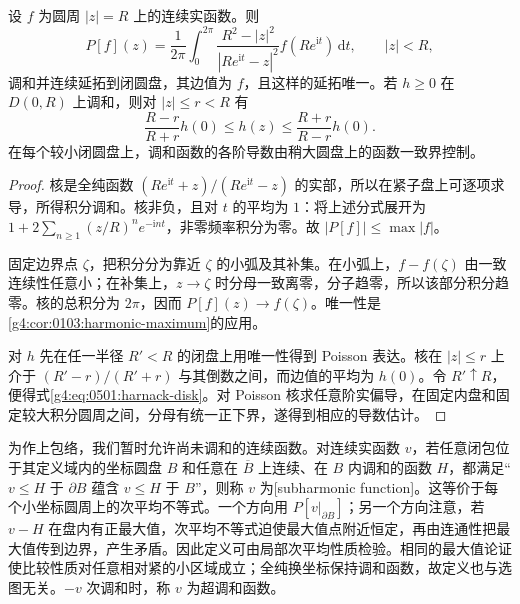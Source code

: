 \begin{lemma}
	\label{g4:lem:0501:poisson}
	设 \(f\) 为圆周 \(|z|=R\) 上的连续实函数。则
	\begin{equation}
		\label{g4:eq:0501:poisson}
		P[f](z)=\frac1{2\pi}\int_0^{2\pi}
		\frac{R^2-|z|^2}{|Re^{\mathrm{i}t}-z|^2}
		f(Re^{\mathrm{i}t})\,\mathrm{d}t,
		\qquad |z|<R,
	\end{equation}
	调和并连续延拓到闭圆盘，其边值为 \(f\)，且这样的延拓唯一。若 \(h\ge0\) 在 \(D(0,R)\) 上调和，则对 \(|z|\le r<R\) 有
	\begin{equation}
		\label{g4:eq:0501:harnack-disk}
		\frac{R-r}{R+r}h(0)\le h(z)
		\le\frac{R+r}{R-r}h(0).
	\end{equation}
	在每个较小闭圆盘上，调和函数的各阶导数由稍大圆盘上的函数一致界控制。
\end{lemma}
\begin{proof}
	核是全纯函数 \((Re^{\mathrm{i}t}+z)/(Re^{\mathrm{i}t}-z)\) 的实部，所以在紧子盘上可逐项求导，所得积分调和。核非负，且对 \(t\) 的平均为 \(1\)：将上述分式展开为 \(1+2\sum_{n\ge1}(z/R)^ne^{-\mathrm{i}nt}\)，非零频率积分为零。故 \(|P[f]|\le\max|f|\)。

	固定边界点 \(\zeta\)，把积分分为靠近 \(\zeta\) 的小弧及其补集。在小弧上，\(f-f(\zeta)\) 由一致连续性任意小；在补集上，\(z\to\zeta\) 时分母一致离零，分子趋零，所以该部分积分趋零。核的总积分为 \(2\pi\)，因而 \(P[f](z)\to f(\zeta)\)。唯一性是\cref{g4:cor:0103:harmonic-maximum}的应用。

	对 \(h\) 先在任一半径 \(R'<R\) 的闭盘上用唯一性得到 Poisson 表达。核在 \(|z|\le r\) 上介于 \((R'-r)/(R'+r)\) 与其倒数之间，而边值的平均为 \(h(0)\)。令 \(R'\uparrow R\)，便得式\eqref{g4:eq:0501:harnack-disk}。对 Poisson 核求任意阶实偏导，在固定内盘和固定较大积分圆周之间，分母有统一正下界，遂得到相应的导数估计。
\end{proof}

为作上包络，我们暂时允许尚未调和的连续函数。对连续实函数 \(v\)，若任意闭包位于其定义域内的坐标圆盘 \(B\) 和任意在 \(\overline B\) 上连续、在 \(B\) 内调和的函数 \(H\)，都满足“\(v\le H\) 于 \(\partial B\) 蕴含 \(v\le H\) 于 \(B\)”，则称 \(v\) 为[subharmonic function]。这等价于每个小坐标圆周上的次平均不等式。一个方向用 \(P[v|_{\partial B}]\)；另一个方向注意，若 \(v-H\) 在盘内有正最大值，次平均不等式迫使最大值点附近恒定，再由连通性把最大值传到边界，产生矛盾。因此定义可由局部次平均性质检验。相同的最大值论证使比较性质对任意相对紧的小区域成立；全纯换坐标保持调和函数，故定义也与选图无关。\(-v\) 次调和时，称 \(v\) 为超调和函数。

